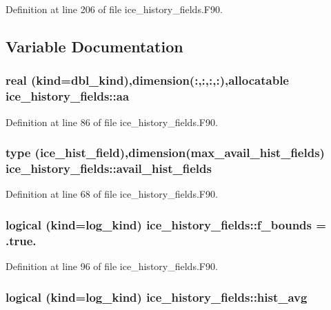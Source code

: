Definition at line 206 of file ice\_\-history\_\-fields.F90.

\subsection{Variable Documentation}
\hypertarget{namespaceice__history__fields_af5f594399a95ba6eccac351207392285}{
\subsubsection[{aa}]{\setlength{\rightskip}{0pt plus 5cm}real (kind=dbl\_\-kind),dimension(:,:,:,:),allocatable {\bf ice\_\-history\_\-fields::aa}}}
\label{namespaceice__history__fields_af5f594399a95ba6eccac351207392285}


Definition at line 86 of file ice\_\-history\_\-fields.F90.\hypertarget{namespaceice__history__fields_a9614b7f86e2f876b54ea179e0bd10b13}{
\subsubsection[{avail\_\-hist\_\-fields}]{\setlength{\rightskip}{0pt plus 5cm}type ({\bf ice\_\-hist\_\-field}),dimension({\bf max\_\-avail\_\-hist\_\-fields}) {\bf ice\_\-history\_\-fields::avail\_\-hist\_\-fields}}}
\label{namespaceice__history__fields_a9614b7f86e2f876b54ea179e0bd10b13}


Definition at line 68 of file ice\_\-history\_\-fields.F90.\hypertarget{namespaceice__history__fields_a2f3cd20e9232a9ef13482e90435469dc}{
\subsubsection[{f\_\-bounds}]{\setlength{\rightskip}{0pt plus 5cm}logical (kind=log\_\-kind) {\bf ice\_\-history\_\-fields::f\_\-bounds} = .true.}}
\label{namespaceice__history__fields_a2f3cd20e9232a9ef13482e90435469dc}


Definition at line 96 of file ice\_\-history\_\-fields.F90.\hypertarget{namespaceice__history__fields_ad443ef4b2750dd319f461697e217bec3}{
\subsubsection[{hist\_\-avg}]{\setlength{\rightskip}{0pt plus 5cm}logical (kind=log\_\-kind) {\bf ice\_\-history\_\-fields::hist\_\-avg}}}
\label{namespaceice__history__fields_ad443ef4b2750dd319f461697e217bec3}


